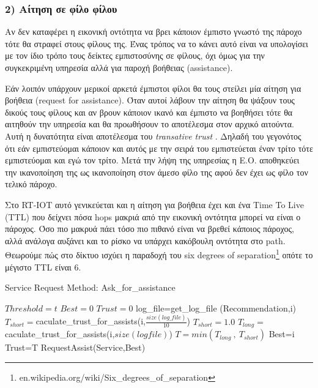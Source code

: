 \subsubsection{2) Αίτηση σε φίλο φίλου}

Αν δεν καταφέρει η εικονική οντότητα να βρει κάποιον έμπιστο γνωστό της πάροχο τότε θα στραφεί στους φίλους της. Ένας τρόπος να το κάνει αυτό είναι να υπολογίσει με τον ίδιο τρόπο τους δείκτες εμπιστοσύνης σε φίλους, όχι όμως για την συγκεκριμένη υπηρεσία αλλά για παροχή βοήθειας (assistance).

 Εάν λοιπόν υπάρχουν μερικοί αρκετά έμπιστοι φίλοι θα τους στείλει μία αίτηση για βοήθεια (request for assistance). Όταν αυτοί λάβουν την αίτηση θα ψάξουν τους δικούς τους φίλους και αν βρουν κάποιον ικανό και έμπιστο να βοηθήσει τότε θα αιτηθούν την υπηρεσία και θα προωθήσουν το αποτέλεσμα στον αρχικό αιτούντα. Αυτή η δυνατότητα είναι αποτέλεσμα του \textit{transative trust}%
 . Δηλαδή του γεγονότος ότι εάν εμπιστεύομαι κάποιον και αυτός με την σειρά του εμπιστεύεται έναν τρίτο τότε εμπιστεύομαι και εγώ τον τρίτο. Μετά την λήψη της υπηρεσίας η Ε.Ο. αποθηκεύει την ικανοποίηση της ως ικανοποίηση στον άμεσο φίλο της αφού δεν έχει ως φίλο τον τελικό πάροχο. 

Στο RT-IOT αυτό γενικεύεται και η αίτηση για βοήθεια έχει και ένα Time To Live (TTL) που δείχνει πόσα hops μακριά από την εικονική οντότητα μπορεί να είναι ο πάροχος. Όσο πιο μακρυά πάει τόσο πιο πιθανό είναι να βρεθεί κάποιος πάροχος, αλλά ανάλογα αυξάνει και το ρίσκο να υπάρχει κακόβουλη οντότητα στο path. Θεωρούμε πώς στο δίκτυο ισχύει η παραδοχή του six degrees of separation\footnote{
en.wikipedia.org/wiki/Six\_degrees\_of\_separation} οπότε το μέγιστο TTL είναι 6.


\begin{algorithm}
\caption{Service Request Method: Ask\_for\_assistance}
\label{Service Request 2}
\begin{algorithmic}[1]
\State $Threshold = t$
\State $Best = 0$
\State $Trust = 0$
\State log\_file=get\_log\_file (Recommendation,i)
\State $T_{short}=$caculate\_trust\_for\_assists(i,$\frac{size \left(log\_file\right)}{10}$)
   \Else \State $T_{short}=1.0$
   \EndIf
\State $T_{long}=$caculate\_trust\_for\_assists(i,$size \left(log file\right)$)
\State $ T = min(T_{long} \  , \  T_{short})$
	\State Best=i
	\State Trust=T
\EndIf
\EndFor
{}
	\State RequestAssist(Service,Best)
\EndIf
\EndProcedure
\end{algorithmic}
\end{algorithm}
\newpage

